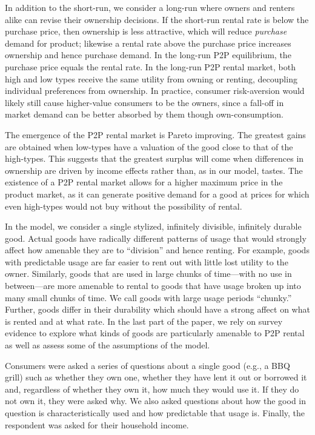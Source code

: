\documentclass[11pt]{article}
\begin{document}
In addition to the short-run, we consider a long-run where owners and renters alike can revise their ownership decisions. 
If the short-run rental rate is below the purchase price, then ownership is less attractive, which will reduce \emph{purchase} demand for product;
likewise a rental rate above the purchase price increases ownership and hence purchase demand.
In the long-run P2P equilibrium, the purchase price equals the rental rate.  
In the long-run P2P rental market, both high and low types receive the same utility from owning or renting, decoupling individual preferences from ownership. 
In practice, consumer risk-aversion would likely still cause higher-value consumers to be the owners, since a fall-off in market demand can be better absorbed by them though own-consumption. 

The emergence of the P2P rental market is Pareto improving. 
The greatest gains are obtained when low-types have a valuation of the good close to that of the high-types. 
This suggests that the greatest surplus will come when differences in ownership are driven by income effects rather than, as in our model, tastes. 
The existence of a P2P rental market allows for a higher maximum price in the product market, as it can generate positive demand for a good at prices for which even high-types would not buy without the possibility of rental. 

In the model, we consider a single stylized, infinitely divisible, infinitely durable good.  
Actual goods have radically different patterns of usage that would strongly affect how amenable they are to ``division'' and hence renting.
For example, goods with predictable usage are far easier to rent out with little lost utility to the owner. 
Similarly, goods that are used in large chunks of time---with no use in between---are more amenable to rental to goods that have usage broken up into many small chunks of time.
We call goods with large usage periods ``chunky.'' 
Further, goods differ in their durability which should have a strong affect on what is rented and at what rate. 
In the last part of the paper, we rely on survey evidence to explore what kinds of goods are particularly amenable to P2P rental as well as assess some of the assumptions of the model. 

Consumers were asked a series of questions about a single good (e.g., a BBQ grill) such as whether they own one, whether they have lent it out or borrowed it and, regardless of whether they own it, how much they would use it. 
If they do not own it, they were asked why. 
We also asked questions about how the good in question is characteristically used and how predictable that usage is. 
Finally, the respondent was asked for their household income.  
\end{document}
